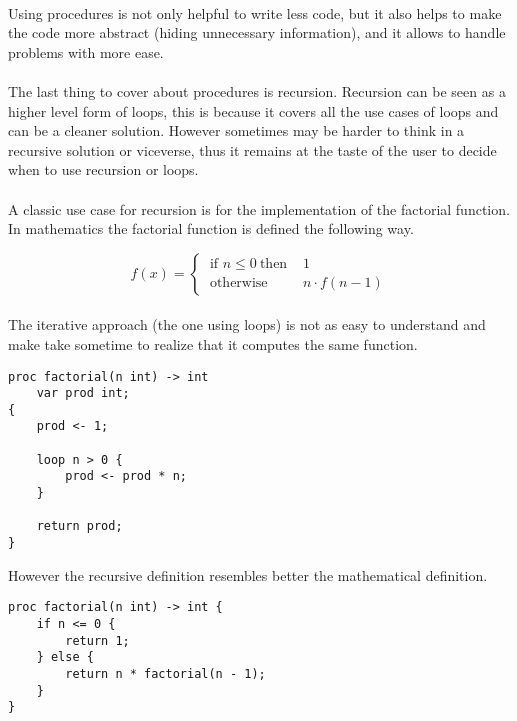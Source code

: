 \paragraph{} Using procedures is not only helpful to write less code, but it
also helps to make the code more abstract (hiding unnecessary information), and
it allows to handle problems with more ease.

\newpage

\paragraph{} The last thing to cover about procedures is recursion. Recursion
can be seen as a higher level form of loops, this is because it covers all the
use cases of loops and can be a cleaner solution. However sometimes may be
harder to think in a recursive solution or viceverse, thus it remains at the
taste of the user to decide when to use recursion or loops.

\paragraph{} A classic use case for recursion is for the implementation of the
factorial function. In mathematics the factorial function is defined the
following way.

\[
    f(x) =
    \begin{cases}
        \ \text{if } n \leq 0\ \text{then } & 1\\
        \ \text{otherwise}  & n \cdot f(n - 1)
    \end{cases}
\]

\paragraph{} The iterative approach (the one using loops) is not as easy to
understand and make take sometime to realize that it computes the same function.

\begin{verbatim}
proc factorial(n int) -> int
    var prod int;
{
    prod <- 1;
    
    loop n > 0 {
        prod <- prod * n;
    }

    return prod;
}
\end{verbatim}

\noindent
However the recursive definition resembles better the mathematical definition.

\begin{verbatim}
proc factorial(n int) -> int {
    if n <= 0 {
        return 1;
    } else {
        return n * factorial(n - 1);
    }
}
\end{verbatim}

